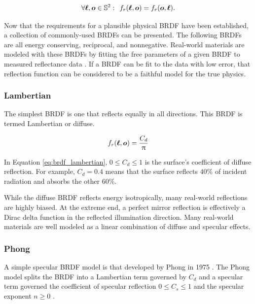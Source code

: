 \begin{equation} \label{eq:brdf_reciprocity}
  \forall \bm{\ell}, \bm{o} \in \mathbb{S}^2 : \:\: f_r(\bm{\ell}, \bm{o}) = f_r(\bm{o}, \bm{\ell}).
\end{equation}

Now that the requirements for a plausible physical BRDF have been established, a collection of commonly-used BRDFs can be presented. The following BRDFs are all energy conserving, reciprocal, and nonnegative. Real-world materials are modeled with these BRDFs by fitting the free parameters of a given BRDF to measured reflectance data \cite{matusik2003}. If a BRDF can be fit to the data with low error, that reflection function can be considered to be a faithful model for the true physics. 

\subsubsection{Lambertian}

The simplest BRDF is one that reflects equally in all directions. This BRDF is termed Lambertian or diffuse.

\begin{equation} \label{eq:brdf_lambertian}
  f_r(\bm{\ell}, \bm{o}) = \frac{C_d}{\uppi}
\end{equation}

In Equation \ref{eq:brdf_lambertian}, $0 \leq C_d \leq 1$ is the surface's coefficient of diffuse reflection. For example, $C_d = 0.4$ means that the surface reflects $40\%$ of incident radiation and absorbs the other $60\%$. 

While the diffuse BRDF reflects energy isotropically, many real-world reflections are highly biased. At the extreme end, a perfect mirror reflection is effectively a Dirac delta function in the reflected illumination direction. Many real-world materials are well modeled as a linear combination of diffuse and specular effects. 

\subsubsection{Phong}

A simple specular BRDF model is that developed by Phong in 1975 \cite{phong1975}. The Phong model splits the BRDF into a Lambertian term governed by $C_d$ and a specular term governed the coefficient of specular reflection $ 0 \leq C_s \leq 1$ and the specular exponent $n \geq 0$ \cite{duvenhage2013}. 


